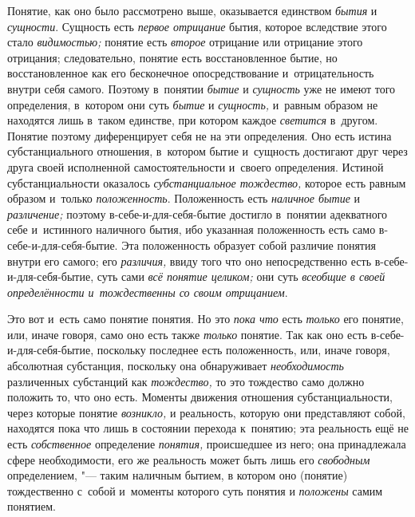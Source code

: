 Понятие, как оно было рассмотрено выше, оказывается единством {\em бытия} и
{\em сущности}. Сущность есть {\em первое отрицание} бытия, которое вследствие
этого стало {\em видимостью;} понятие есть {\em второе}
отрицание или отрицание этого отрицания; следовательно,
понятие есть восстановленное бытие, но восстановленное как его бесконечное
опосредствование и~отрицательность внутри себя самого. Поэтому в~понятии
{\em бытие} и {\em сущность} уже не имеют того определения, в~котором они суть
{\em бытие} и {\em сущность,} и~равным образом не находятся лишь в~таком
единстве, при котором каждое {\em светится} в~другом.
Понятие поэтому диференцирует себя не на эти определения. Оно есть истина
субстанциального отношения, в~котором бытие и~сущность достигают друг через
друга своей исполненной самостоятельности и~своего определения. Истиной
субстанциальности оказалось {\em субстанциальное тождество,}
которое есть равным образом и~только {\em положенность}.
Положенность есть {\em наличное бытие} и {\em различение;} поэтому
в-себе-и-для-себя-бытие достигло в~понятии адекватного себе и~истинного
наличного бытия, ибо указанная положенность есть само
в-себе-и-для-себя-бытие. Эта положенность образует собой различие понятия
внутри его самого; его {\em различия,} ввиду того что
оно
непосредственно есть в-себе-и-для-себя-бытие, суть сами
{\em всё понятие целиком;} они суть {\em всеобщие в
своей определённости и~тождественны со своим отрицанием}.

Это вот и~есть само понятие понятия. Но это {\em пока что} есть
{\em только} его понятие, или, иначе говоря, само оно есть также
{\em только} понятие. Так
как оно есть в-себе-и-для-себя-бытие, поскольку последнее есть
положенность, или, иначе говоря, абсолютная субстанция, поскольку она
обнаруживает {\em необходимость} различенных субстанций как
{\em тождество,} то это
тождество само должно положить то, что оно есть. Моменты движения отношения
субстанциальности, через которые понятие {\em возникло,} и
реальность, которую они представляют собой, находятся пока что лишь в
состоянии перехода к~понятию; эта реальность ещё не есть
{\em собственное} определение {\em понятия,}
происшедшее из него; она принадлежала сфере необходимости,
его же реальность может быть лишь его {\em свободным}
определением, "--- таким наличным бытием, в
котором оно (понятие) тождественно с~собой и~моменты которого суть понятия
и {\em положены} самим понятием.

